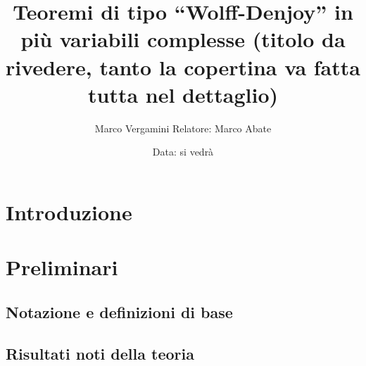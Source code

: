 \documentclass{article}
\title{Teoremi di tipo ``Wolff-Denjoy'' in più variabili complesse (titolo da rivedere, tanto la copertina va fatta tutta nel dettaglio)}
\author{Marco Vergamini Relatore: Marco Abate}
\date{Data: si vedrà}
\begin{document}
\maketitle
\newpage
\tableofcontents
\newpage


\section*{Introduzione}


\newpage

\section{Preliminari}
\subsection{Notazione e definizioni di base}

\subsection{Risultati noti della teoria}


\newpage

%
%
%


%
%
%
\end{document}
